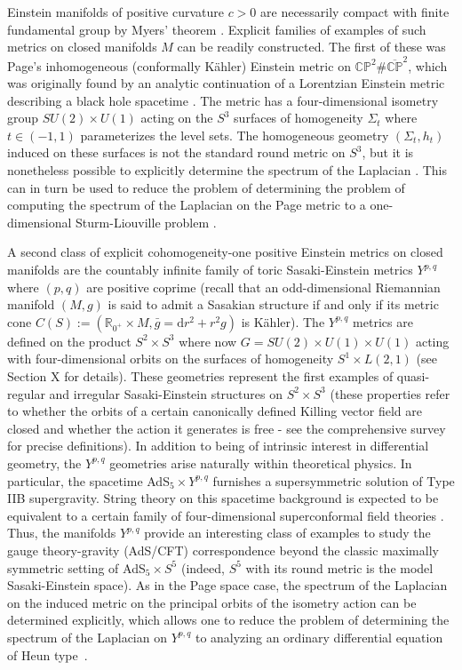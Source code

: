 \documentclass[11pt]{amsart}
\theoremstyle{plain}
\newcommand{\td}{\text{d}}
\theoremstyle{definition}
\numberwithin{equation}{section}
\begin{document}
Einstein manifolds of positive curvature $c>0$ are necessarily compact with finite fundamental group by Myers' theorem \cite{Myers}. Explicit families of examples of such metrics on closed manifolds $M$ can be readily constructed. The first of these was Page's inhomogeneous (conformally K\"ahler) Einstein metric on $\mathbb{CP}^2 \# \overline{\mathbb{CP}}^2$, which was originally found by an analytic continuation of a Lorentzian Einstein metric describing a black hole spacetime \cite{Page}. The metric has a four-dimensional isometry group $SU(2) \times U(1)$ acting on the $S^3$ surfaces of homogeneity $\Sigma_t$ where $t\in (-1,1)$ parameterizes the level sets. The homogeneous geometry $(\Sigma_t,h_t)$ induced on these surfaces is not the standard round metric on $S^3$, but it is nonetheless possible to explicitly determine the spectrum of the Laplacian \cite{Wu:1976ge, Hennigar}. This can in turn be used to reduce the problem of determining the problem of computing the spectrum of the Laplacian on the Page metric to a one-dimensional Sturm-Liouville problem \cite{Hennigar}. 

A second class of explicit cohomogeneity-one positive Einstein metrics on closed manifolds are the countably infinite family of toric Sasaki-Einstein metrics $Y^{p,q}$ where $(p,q)$ are positive coprime  \cite{Gauntlett:2004yd} (recall that an odd-dimensional Riemannian manifold $(M,g)$ is said to admit a Sasakian structure if and only if its metric cone $C(S):= (\mathbb{R}_{0^+} \times M, \bar{g} = \td r^2 + r^2 g)$ is K\"ahler). The $Y^{p,q}$ metrics are defined on the product $S^2 \times S^3$ where now $G = SU(2) \times U(1) \times U(1)$ acting with four-dimensional orbits on the surfaces of homogeneity $S^1 \times L(2,1)$ (see Section X for details). These geometries represent the first examples of quasi-regular and irregular Sasaki-Einstein structures on $S^2 \times S^3$ (these properties refer to whether the orbits of a certain canonically defined Killing vector field are closed and whether the action it generates is free - see the comprehensive survey \cite{Sparks} for precise definitions). In addition to being of intrinsic interest in differential geometry, the $Y^{p,q}$ geometries arise naturally within theoretical physics. In particular, the spacetime AdS$_5 \times Y^{p,q}$ furnishes a supersymmetric solution of Type IIB supergravity. String theory on this spacetime background is expected to be equivalent to a certain family of four-dimensional superconformal field theories \cite{Martelli:2004wu}. Thus, the manifolds $Y^{p,q}$ provide an interesting class of examples to study the gauge theory-gravity (AdS/CFT) correspondence beyond the classic maximally symmetric setting of AdS$_5 \times S^5$ \cite{AdSCFT} (indeed, $S^5$ with its round metric is the model Sasaki-Einstein space). As in the Page space case, the spectrum of the Laplacian on the induced metric on the principal orbits of the isometry action can be determined explicitly, which allows one to reduce the problem of determining the spectrum of the Laplacian on $Y^{p,q}$ to analyzing an ordinary differential equation of Heun type~\cite{Kihara:2005nt}.
\end{document}
